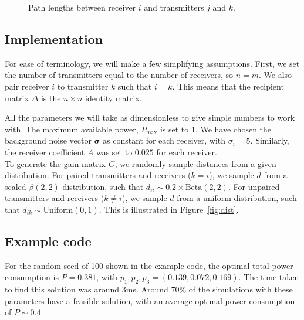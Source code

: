 \documentclass[twocolumn,secnumarabic,amssymb, nobibnotes, aps, prl,superscriptaddress]{revtex4-1}
\begin{document}
\begin{figure}[H]
\centering
{}
\caption{\label{fig:pathgain}Path lengths between receiver $i$ and transmitters $j$ and $k$.}
\end{figure}

\subsection{Implementation}
\noindent For ease of terminology, we will make a few simplifying assumptions.  First, we set the number of transmitters equal to the number of receivers, so $n=m$.  We also pair receiver $i$ to transmitter $k$ such that $i=k$.  This means that the recipient matrix $\Delta$ is the $n\times n$ identity matrix.

All the parameters we will take as dimensionless to give simple numbers to work with.  The maximum available power, $P_{\text{max}}$ is set to 1.  We have chosen the background noise vector $\boldsymbol{\sigma}$ as constant for each receiver, with $\sigma_i = 5$.  Similarly, the receiver coefficient $A$ was set to $0.025$ for each receiver. \\ 

To generate the gain matrix $G$, we randomly sample distances from a given distribution.  For paired transmitters and receivers ($k=i$), we sample $d$ from a scaled $\beta(2,2)$ distribution, such that $d_{ii} \sim 0.2\times\text{Beta}(2,2)$.  For unpaired transmitters and receivers ($k\neq i$), we sample $d$ from a uniform distribution, such that $d_{ik} \sim \text{Uniform}(0,1)$.  This is illustrated in Figure~\ref{fig:dist}.

\subsection{Example code}
\noindent For the random seed of 100 shown in the example code, the optimal total power consumption is $P = 0.381$, with $p_1,p_2,p_3 = (0.139, 0.072, 0.169)$.  The time taken to find this solution was around 3ms.  Around 70\% of the simulations with these parameters have a feasible solution, with an average optimal power consumption of $P\sim0.4$.
\end{document}
